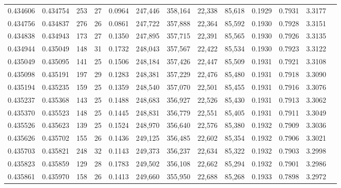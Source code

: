 \begin{tabular}{rrrrrrrrrrrrr}
0.434606 & 0.434754 & 253 &  27 &                                     0.0964 & 247,446 & 358,164 &  22,338 &  85,618 & 0.1929 & 0.7931 & 3.3177 \\
0.434756 & 0.434837 & 276 &  26 &                                     0.0861 & 247,722 & 357,888 &  22,364 &  85,592 & 0.1930 & 0.7928 & 3.3151 \\
0.434838 & 0.434943 & 173 &  27 &                                     0.1350 & 247,895 & 357,715 &  22,391 &  85,565 & 0.1930 & 0.7926 & 3.3135 \\
0.434944 & 0.435049 & 148 &  31 &                                     0.1732 & 248,043 & 357,567 &  22,422 &  85,534 & 0.1930 & 0.7923 & 3.3122 \\
0.435049 & 0.435095 & 141 &  25 &                                     0.1506 & 248,184 & 357,426 &  22,447 &  85,509 & 0.1931 & 0.7921 & 3.3108 \\
0.435098 & 0.435191 & 197 &  29 &                                     0.1283 & 248,381 & 357,229 &  22,476 &  85,480 & 0.1931 & 0.7918 & 3.3090 \\
0.435194 & 0.435235 & 159 &  25 &                                     0.1359 & 248,540 & 357,070 &  22,501 &  85,455 & 0.1931 & 0.7916 & 3.3076 \\
0.435237 & 0.435368 & 143 &  25 &                                     0.1488 & 248,683 & 356,927 &  22,526 &  85,430 & 0.1931 & 0.7913 & 3.3062 \\
0.435370 & 0.435523 & 148 &  25 &                                     0.1445 & 248,831 & 356,779 &  22,551 &  85,405 & 0.1931 & 0.7911 & 3.3049 \\
0.435526 & 0.435623 & 139 &  25 &                                     0.1524 & 248,970 & 356,640 &  22,576 &  85,380 & 0.1932 & 0.7909 & 3.3036 \\
0.435626 & 0.435702 & 155 &  26 &                                     0.1436 & 249,125 & 356,485 &  22,602 &  85,354 & 0.1932 & 0.7906 & 3.3021 \\
0.435703 & 0.435821 & 248 &  32 &                                     0.1143 & 249,373 & 356,237 &  22,634 &  85,322 & 0.1932 & 0.7903 & 3.2998 \\
0.435823 & 0.435859 & 129 &  28 &                                     0.1783 & 249,502 & 356,108 &  22,662 &  85,294 & 0.1932 & 0.7901 & 3.2986 \\
0.435861 & 0.435970 & 158 &  26 &                                     0.1413 & 249,660 & 355,950 &  22,688 &  85,268 & 0.1933 & 0.7898 & 3.2972 \\

\end{tabular}
